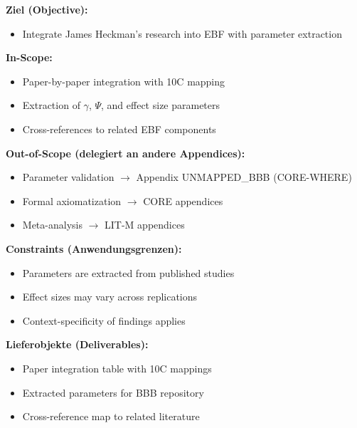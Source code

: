 
\begin{tcolorbox}[
    colback=orange!5!white,
    colframe=orange!75!black,
    title={\textbf{Appendix Scope: Ziel / In-Scope / Out-of-Scope / Constraints}},
    fonttitle=\bfseries
]

\textbf{Ziel (Objective):}
\begin{itemize}[nosep]
    \item Integrate James Heckman's research into EBF with parameter extraction
\end{itemize}

\textbf{In-Scope:}
\begin{itemize}[nosep]
    \item Paper-by-paper integration with 10C mapping
    \item Extraction of $\gamma$, $\Psi$, and effect size parameters
    \item Cross-references to related EBF components
\end{itemize}

\textbf{Out-of-Scope (delegiert an andere Appendices):}
\begin{itemize}[nosep]
    \item Parameter validation $\rightarrow$ Appendix UNMAPPED_BBB (CORE-WHERE)
    \item Formal axiomatization $\rightarrow$ CORE appendices
    \item Meta-analysis $\rightarrow$ LIT-M appendices
\end{itemize}

\textbf{Constraints (Anwendungsgrenzen):}
\begin{itemize}[nosep]
    \item Parameters are extracted from published studies
    \item Effect sizes may vary across replications
    \item Context-specificity of findings applies
\end{itemize}

\textbf{Lieferobjekte (Deliverables):}
\begin{itemize}[nosep]
    \item Paper integration table with 10C mappings
    \item Extracted parameters for BBB repository
    \item Cross-reference map to related literature
\end{itemize}

\end{tcolorbox}

